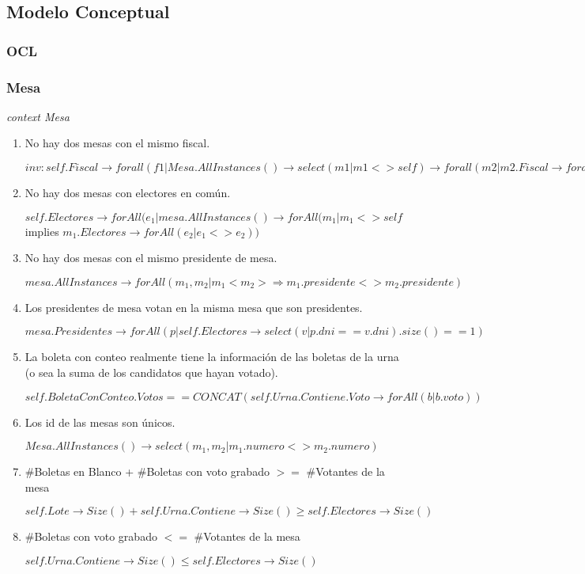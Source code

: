 \subsection{Modelo Conceptual}

\subsubsection{OCL}


\subsubsection*{Mesa}

\textit{context Mesa}
\begin{enumerate}
\item  No hay dos mesas con el mismo fiscal.

$inv: 
self.Fiscal \rightarrow forall(f1 | Mesa.AllInstances() \rightarrow select(m1 | m1 <> self) \rightarrow forall(m2 | m2.Fiscal \rightarrow forall(f2 | f1 <> f2)))$

\item No hay dos mesas con electores en común.

$self.Electores \rightarrow forAll(e_1 | mesa.AllInstances() \rightarrow forAll(m_1 | m_1 <> self$ implies $m_1.Electores  \rightarrow forAll(e_2 | e_1 <> e_2))$

\item No hay dos mesas con el mismo presidente de mesa.

$mesa.AllInstances \rightarrow forAll(m_1, m_2 | m_1<m_2> \Rightarrow m_1.presidente <> m_2.presidente)$

\item Los presidentes de mesa votan en la misma mesa que son presidentes.

$mesa.Presidentes  \rightarrow forAll(p | self.Electores  \rightarrow select(v | p.dni == v.dni).size() == 1)$

\item La boleta con conteo realmente tiene la información de las boletas de la urna (o sea la suma de los candidatos que hayan votado).

$self.BoletaConConteo.Votos == CONCAT(self.Urna.Contiene.Voto \rightarrow forAll(b | b.voto)) $

\item Los id de las mesas son únicos.

$Mesa.AllInstances() \rightarrow select(m_1, m_2 | m_1.numero <> m_2.numero)$

\item \#Boletas en Blanco + \#Boletas con voto grabado $>=$ \#Votantes de la mesa

$self.Lote \rightarrow Size() + self.Urna.Contiene \rightarrow Size () \geq self.Electores \rightarrow Size()$

\item \#Boletas con voto grabado $<=$ \#Votantes de la mesa

$self.Urna.Contiene  \rightarrow  Size() \leq self.Electores \rightarrow Size()$

\end{enumerate}

